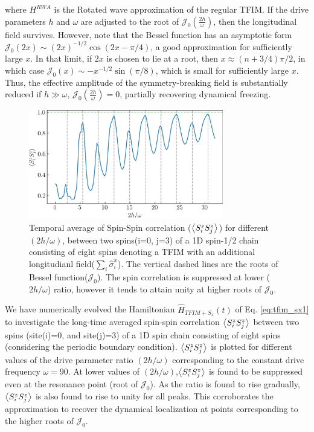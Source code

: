 \documentclass[aps,prb,reprint,showpacs,floatfix,superscriptaddress, onecolumn, nofootinbib, 9pt]{revtex4-2}
\begin{document}
\begin{enumerate}
{\begin{equation}
				\label{eq:tfim_sx1}
			\end{equation}
			where $H^{RWA}$ is the Rotated wave approximation of the regular TFIM. If the drive parameters $h$ and $\omega$ are adjusted to the root of $\mathcal{J}_0\left(\frac{2h}{\omega}\right)$, then the longitudinal field survives. However, note that the Bessel function has an asymptotic form $\mathcal{J}_0(2x)\sim (2x)^{-1/2}\cos(2x-\pi/4)$, a good approximation for sufficiently large $x$. In that limit, if $2x$ is chosen to lie at a root, then $x\approx (n+3/4)\pi/2$, in which case $\mathcal{J}_0(x) \sim -x^{-1/2}\sin{\left(\pi/8\right)}$, which is small for sufficiently large $x$. Thus, the effective amplitude of the symmetry-breaking field  is substantially reduced if $h\gg\omega$, $\mathcal{J}_0\left(\frac{2h}{\omega}\right)=0$, partially recovering dynamical freezing.
			\begin{figure}[h!]
				\includegraphics[width=8.5cm]{corrN8sz0sz3avg_onlynn_tfim_sx.jpeg}
				\caption{Temporal average of Spin-Spin correlation ($\expval{S^z_i S^z_j}$) for different $(2h/\omega)$, between two spins(i=0, j=3) of a 1D spin-1/2 chain consisting of eight spins denoting a TFIM with an additional longitudianl field($\sum_i\hat{\sigma}^x_i$).  The  vertical dashed lines are the roots of Bessel function($\mathcal{J}_0$). The spin correlation is suppressed at lower ($2h/\omega$) ratio, however it tends to attain unity at higher roots of $\mathcal{J}_0$.}
				\label{fig:TFIM_sx}
			\end{figure}
			
			We have numerically evolved the Hamiltonian $\hat{H}_{TFIM+S_x}(t)$ of Eq. \eqref{eq:tfim_sx1} to investigate the long-time averaged spin-spin correlation $\expval{S^z_i S^z_{j}}$ between two spins (site(i)=0, and site(j)=3) of a 1D spin chain consisting of eight spins (considering the periodic boundary condition).  $\expval{S^z_i S^z_{j}}$ is plotted for different values of the drive parameter ratio $(2h/\omega)$ corresponding to the constant drive frequency $\omega=90$. At lower values of $(2h/\omega)$,$\expval{S^z_i S^z_{j}}$ is found to be suppressed even at the resonance point (root of $\mathcal{J}_0$). As the ratio is found to rise gradually, $\expval{S^z_i S^z_{j}}$ is also found to rise to unity for all peaks. This corroborates the approximation to recover the dynamical localization at points corresponding to the higher roots of $\mathcal{J}_0$.
		}
		

\end{enumerate}
\end{document}
